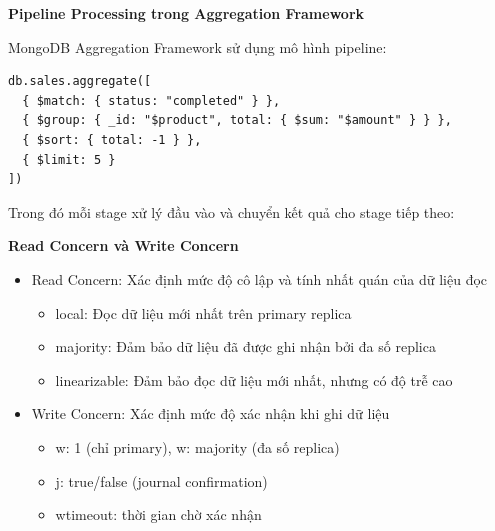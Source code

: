 \textbf{Pipeline Processing trong Aggregation Framework}

MongoDB Aggregation Framework sử dụng mô hình pipeline:

\begin{lstlisting}[style=mongodb, caption=Ví dụ MongoDB Query, label=mongodb:example]
db.sales.aggregate([
  { $match: { status: "completed" } },
  { $group: { _id: "$product", total: { $sum: "$amount" } } },
  { $sort: { total: -1 } },
  { $limit: 5 }
])
\end{lstlisting}

Trong đó mỗi stage xử lý đầu vào và chuyển kết quả cho stage tiếp theo:



\textbf{Read Concern và Write Concern}

\begin{itemize}
    \item Read Concern: Xác định mức độ cô lập và tính nhất quán của dữ liệu đọc
    \begin{itemize}
        \item local: Đọc dữ liệu mới nhất trên primary replica
        \item majority: Đảm bảo dữ liệu đã được ghi nhận bởi đa số replica
        \item linearizable: Đảm bảo đọc dữ liệu mới nhất, nhưng có độ trễ cao
    \end{itemize}
    \item Write Concern: Xác định mức độ xác nhận khi ghi dữ liệu
    \begin{itemize}
        \item w: 1 (chỉ primary), w: majority (đa số replica)
        \item j: true/false (journal confirmation)
        \item wtimeout: thời gian chờ xác nhận
    \end{itemize}
\end{itemize}


